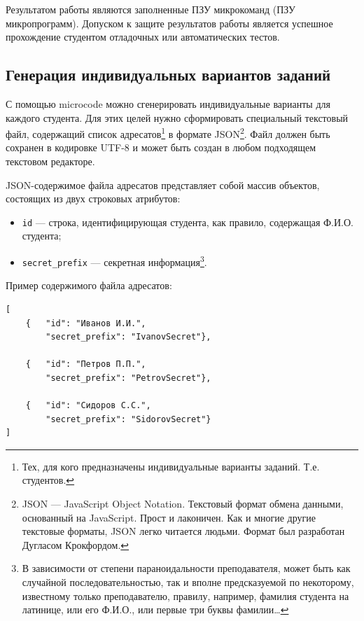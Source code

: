 Результатом работы являются заполненные ПЗУ микрокоманд (ПЗУ микропрограмм). Допуском к защите результатов работы является успешное прохождение студентом отладочных или автоматических тестов.


\subsection{Генерация индивидуальных вариантов заданий}

С помощью microcode можно сгенерировать индивидуальные варианты для каждого студента. Для этих целей нужно сформировать специальный текстовый файл, содержащий список адресатов\footnote{Тех, для кого предназначены индивидуальные варианты заданий. Т.е. студентов.} в формате JSON\footnote{JSON --- JavaScript Object Notation.  Текстовый формат обмена данными, основанный на JavaScript. Прост и лаконичен. Как и многие другие текстовые форматы, JSON легко читается людьми. Формат был разработан Дугласом Крокфордом.}. Файл должен быть сохранен в кодировке UTF-8 и может быть создан в любом подходящем текстовом редакторе.

JSON-содержимое файла адресатов представляет собой массив объектов, состоящих из двух строковых атрибутов:
\begin{itemize}
    \item \verb"id" --- строка, идентифицирующая студента, как правило, содержащая Ф.И.О. студента;
    \item \verb"secret_prefix" --- секретная информация\footnote{В зависимости от степени параноидальности преподавателя, может быть как случайной последовательностью, так и вполне предсказуемой по некоторому, известному только преподавателю, правилу, например, фамилия студента на латинице, или его Ф.И.О., или первые три буквы фамилии\ldots}.
\end{itemize}

Пример содержимого файла адресатов:
\begin{verbatim}
[
    {   "id": "Иванов И.И.",
        "secret_prefix": "IvanovSecret"},
        
    {   "id": "Петров П.П.",
        "secret_prefix": "PetrovSecret"},
        
    {   "id": "Сидоров С.С.",
        "secret_prefix": "SidorovSecret"}
]
\end{verbatim}


